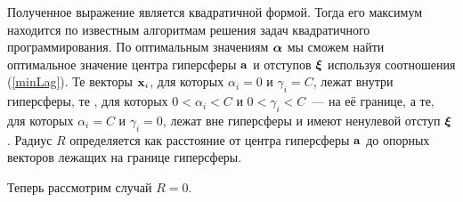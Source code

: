 Полученное выражение является квадратичной формой. 
Тогда его максимум находится по известным алгоритмам решения задач квадратичного программирования. 
По оптимальным значениям $\boldsymbol{\mathbf{\alpha}}$ мы сможем найти оптимальное значение центра гиперсферы $\boldsymbol{\mathbf{a}}$ и отступов $\boldsymbol{\mathbf{\xi}}$ используя соотношения (\ref{minLag}). 
Те векторы $\boldsymbol{\mathbf{x}}_i$, для которых $\alpha_i=0$ и $\gamma_i=C$, лежат внутри гиперсферы, те , для которых $0<\alpha_i<C$ и $0<\gamma_i<C$~--- на её границе, а те, для которых $\alpha_i=C$ и $\gamma_i=0$, лежат вне гиперсферы и имеют ненулевой отступ $\boldsymbol{\mathbf{\xi}}$. 
Радиус $R$ определяется как расстояние от центра гиперсферы $\boldsymbol{\mathbf{a}}$ до опорных векторов лежащих на границе гиперсферы.

Теперь рассмотрим случай $R = 0$. 

